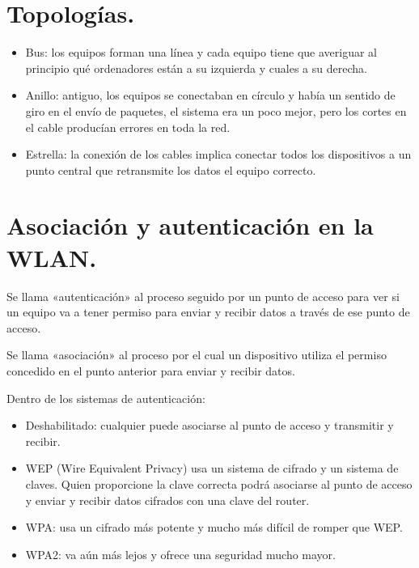 \documentclass[letterpaper,10pt,spanish]{sphinxmanual}
\begin{document}
\section{Topologías.}
\label{\detokenize{t2_integracion_elementos/apuntes_t2:topologias}}\begin{itemize}
\item {} 
\sphinxAtStartPar
Bus: los equipos forman una línea y cada equipo tiene que averiguar al principio qué ordenadores están a su izquierda y cuales a su derecha. 

\item {} 
\sphinxAtStartPar
Anillo: antiguo,  los equipos se conectaban en círculo y había un sentido de giro en el envío de paquetes, el sistema era un poco mejor, pero los cortes en el cable producían errores en toda la red. 

\item {} 
\sphinxAtStartPar
Estrella: la conexión de los cables implica conectar todos los dispositivos a un punto central que retransmite los datos el equipo correcto. 

\end{itemize}


\section{Asociación y autenticación en la WLAN.}
\label{\detokenize{t2_integracion_elementos/apuntes_t2:asociacion-y-autenticacion-en-la-wlan}}
\sphinxAtStartPar
Se llama «autenticación» al proceso seguido por un punto de acceso para ver si un equipo va a tener permiso para enviar y recibir datos a través de ese punto de acceso.

\sphinxAtStartPar
Se llama «asociación» al proceso por el cual un dispositivo utiliza el permiso concedido en el punto anterior para enviar y recibir datos.

\sphinxAtStartPar
Dentro de los sistemas de autenticación:
\begin{itemize}
\item {} 
\sphinxAtStartPar
Deshabilitado: cualquier puede asociarse al punto de acceso y transmitir y recibir.

\item {} 
\sphinxAtStartPar
WEP (Wire Equivalent Privacy) usa un sistema de cifrado y un sistema de claves. Quien proporcione la clave correcta podrá asociarse al punto de acceso y enviar y recibir datos cifrados con una clave del router.

\item {} 
\sphinxAtStartPar
WPA: usa un cifrado más potente y mucho más difícil de romper que WEP.

\item {} 
\sphinxAtStartPar
WPA2: va aún más lejos y ofrece una seguridad mucho mayor.

\end{itemize}
\end{document}

